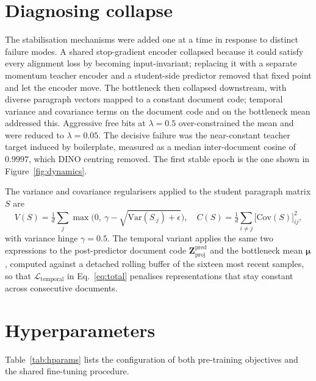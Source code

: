 \documentclass[conference]{IEEEtran}
\begin{document}
\section{Diagnosing collapse}
\label{app:collapse}
The stabilisation mechanisms were added one at a time in response to distinct
failure modes. A shared stop-gradient encoder collapsed because it could satisfy
every alignment loss by becoming input-invariant; replacing it with a separate
momentum teacher encoder and a student-side predictor removed that fixed point and
let the encoder move. The bottleneck then collapsed downstream, with diverse
paragraph vectors mapped to a constant document code; temporal variance and
covariance terms on the document code and on the bottleneck mean addressed this.
Aggressive free bits at $\lambda = 0.5$ over-constrained the mean and were reduced to
$\lambda = 0.05$. The decisive failure was the near-constant teacher target induced
by boilerplate, measured as a median inter-document cosine of $0.9997$, which DINO
centring removed. The first stable epoch is the one shown in
Figure~\ref{fig:dynamics}.

The variance and covariance regularisers applied to the student paragraph matrix
$S$ are
\begin{equation}
V(S) = \tfrac{1}{d}\sum_{j} \max\!\big(0,\ \gamma - \sqrt{\mathrm{Var}(S_{\cdot j}) + \epsilon}\big),
\quad
C(S) = \tfrac{1}{d}\sum_{i \ne j} \big[\mathrm{Cov}(S)\big]_{ij}^2,
\end{equation}
with variance hinge $\gamma = 0.5$. The temporal variant applies the same two
expressions to the post-predictor document code
$\bm{Z}_{\mathrm{proj}}^{\mathrm{pred}}$ and the bottleneck mean $\bm{\mu}$, computed
against a detached rolling buffer of the sixteen most recent samples, so that
$\mathcal{L}_{\mathrm{temporal}}$ in Eq.~\ref{eq:total} penalises representations
that stay constant across consecutive documents.

\section{Hyperparameters}
\label{app:hparams}
Table~\ref{tab:hparams} lists the configuration of both pre-training objectives and
the shared fine-tuning procedure.
\end{document}
